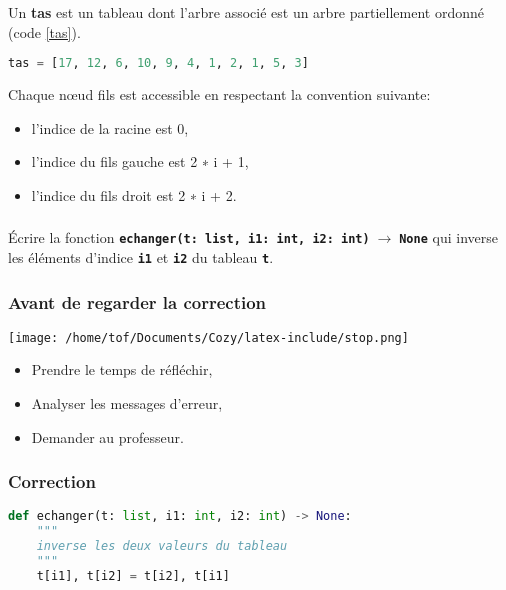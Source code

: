 \documentclass[svgnames,11pt]{beamer}
\begin{document}
\begin{frame}[fragile]
    \frametitle{}

    Un \textbf{tas} est un tableau dont l'arbre associé est un arbre partiellement ordonné (code \ref{tas}).

    \begin{center}
        \begin{lstlisting}[language=Python , basicstyle=\ttfamily\small, xleftmargin=2em, xrightmargin=2em]
tas = [17, 12, 6, 10, 9, 4, 1, 2, 1, 5, 3]
\end{lstlisting}
        \label{tas}
    \end{center}
    Chaque nœud fils est accessible en respectant la convention suivante:
    \begin{itemize}
        \item l'indice de la racine est 0,
        \item l’indice du fils gauche est 2 ∗ i + 1,
        \item l’indice du fils droit est 2 ∗ i + 2.
    \end{itemize}

\end{frame}
\begin{frame}
    \frametitle{}

    \begin{activite}
        Écrire la fonction \texttt{\textbf{echanger(t: list, i1: int, i2: int)$\;\rightarrow\;$None}} qui inverse les éléments d'indice \textbf{\texttt{i1}} et \textbf{\texttt{i2}} du tableau \textbf{\texttt{t}}.
    \end{activite}

\end{frame}
\begin{frame}
    \frametitle{Avant de regarder la correction}
    \begin{center}
        \centering
        \texttt{[image: /home/tof/Documents/Cozy/latex-include/stop.png]}
    \end{center}
    {\Large
    \begin{itemize}
        \item Prendre le temps de réfléchir,
        \item Analyser les messages d'erreur,
        \item Demander au professeur.
    \end{itemize}
    }
\end{frame}
\begin{frame}[fragile]
    \frametitle{Correction}

    \begin{center}
        \begin{lstlisting}[language=Python , basicstyle=\ttfamily\small, xleftmargin=2em, xrightmargin=0em]
def echanger(t: list, i1: int, i2: int) -> None:
    """
    inverse les deux valeurs du tableau
    """
    t[i1], t[i2] = t[i2], t[i1]
\end{lstlisting}
    \end{center}

\end{frame}
\end{document}
